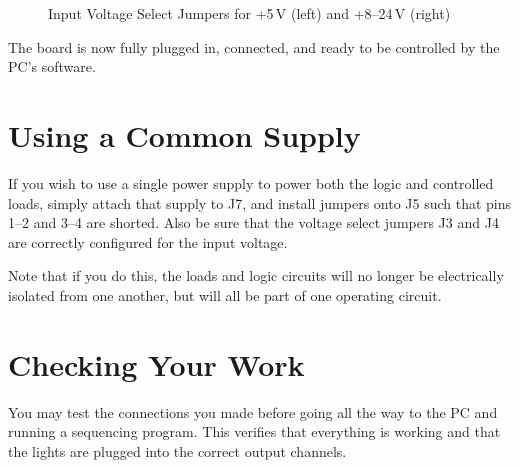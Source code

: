 \documentclass[letterpaper,twoside,onecolumn,openright,final]{memoir}
\begin{document}
\begin{figure}
    \begin{center}
	\caption{Input Voltage Select Jumpers for +5\,V (left) and +8--24\,V (right)\label{fig:jumpers}}
    \end{center}
\end{figure}

The board is now fully plugged in, connected, and ready to be controlled by the PC's software.

\section{Using a Common Supply}
If you wish to use a single power supply to power both the logic and controlled loads, simply attach
that supply to J7, and install jumpers onto J5 such that pins 1--2 and 3--4 are shorted.  Also be sure
that the voltage select jumpers J3 and J4 are correctly configured for the input voltage.

Note that if you do this, the loads and logic circuits will no longer be electrically isolated from
one another, but will all be part of one operating circuit.

\section{Checking Your Work}
You may test the connections you made before going all the way to the PC and running a sequencing program.
This verifies that everything is working and that the lights are plugged into the correct output channels.
\end{document}
